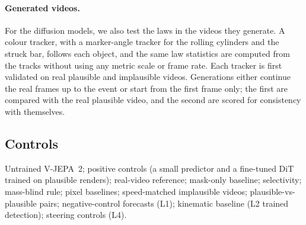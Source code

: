 \documentclass[10pt]{article}
\begin{document}
\paragraph{Generated videos.}
For the diffusion models, we also test the laws in the videos they generate. A colour tracker, with a marker-angle
tracker for the rolling cylinders and the struck bar, follows each object, and the same law statistics are computed
from the tracks without using any metric scale or frame rate. Each tracker is first validated on real plausible and
implausible videos. Generations either continue the real frames up to the event or start from the first frame only;
the first are compared with the real plausible video, and the second are scored for consistency with themselves.

\subsection{Controls}
\label{sec:controls}
Untrained V-JEPA~2; positive controls (a small predictor and a fine-tuned DiT trained on plausible renders); real-video
reference; mask-only baseline; selectivity; mass-blind rule; pixel baselines; speed-matched implausible videos;
plausible-vs-plausible pairs; negative-control forecasts (L1); kinematic baseline (L2 trained detection); steering controls (L4).
\end{document}
